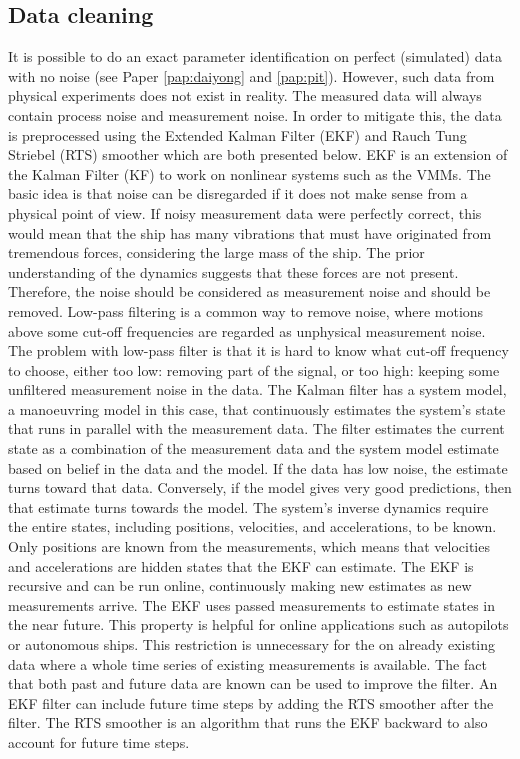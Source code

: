 \subsection{Data cleaning}
\label{sec:datacleaning}
It is possible to do an exact parameter identification on perfect (simulated) data with no noise (see Paper \ref{pap:daiyong} and \ref{pap:pit}). However, such data from physical experiments does not exist in reality. The measured data will always contain process noise and measurement noise. In order to mitigate this, the data is preprocessed using the Extended Kalman Filter (EKF) \cite{brown_introduction_1997} and Rauch Tung Striebel (RTS) smoother \cite{rauch_maximum_1965} which are both presented below.
EKF is an extension of the Kalman Filter (KF) to work on nonlinear systems such as the VMMs. The basic idea is that noise can be disregarded if it does not make sense from a physical point of view. If noisy measurement data were perfectly correct, this would mean that the ship has many vibrations that must have originated from tremendous forces, considering the large mass of the ship. The prior understanding of the dynamics suggests that these forces are not present. Therefore, the noise should be considered as measurement noise and should be removed. Low-pass filtering is a common way to remove noise, where motions above some cut-off frequencies are regarded as unphysical measurement noise. The problem with low-pass filter is that it is hard to know what cut-off frequency to choose, either too low: removing part of the signal, or too high: keeping some unfiltered measurement noise in the data. The Kalman filter has a system model, a manoeuvring model in this case, that continuously estimates the system’s state that runs in parallel with the measurement data. The filter estimates the current state as a combination of the measurement data and the system model estimate based on belief in the data and the model. If the data has low noise, the estimate turns toward that data. Conversely, if the model gives very good predictions, then that estimate turns towards the model.
The system’s inverse dynamics require the entire states, including positions, velocities, and accelerations, to be known. Only positions are known from the measurements, which means that velocities and accelerations are hidden states that the EKF can estimate.
The EKF is recursive and can be run online, continuously making new estimates as new measurements arrive. The EKF uses passed measurements to estimate states in the near future. This property is helpful for online applications such as  autopilots or autonomous ships. This restriction is  unnecessary for the  on already existing data where a whole time series of existing measurements is available. The fact that both past and future data are known can be used to improve the filter. An EKF filter can include future time steps by adding the RTS smoother after the filter. The RTS smoother is an algorithm that runs the EKF backward to also account for future time steps.



